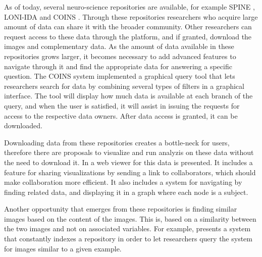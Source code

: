 
As of today, several neuro-science repositories are available, for example SPINE \autocite{guttmann_spine_2012}, LONI-IDA \autocite{van_horn_is_2009} and COINS \autocite{wood_harnessing_2014}. Through these repositories researchers who acquire large amount of data can share it with the broader community. Other researchers can request access to these data through the platform, and if granted, download the images and complementary data. As the amount of data available in these repositories grows larger, it becomes necessary to add advanced features to navigate through it and find the appropriate data for answering a specific question. The COINS system implemented a graphical query tool\autocite{wood_harnessing_2014} that lets researchers search for data by combining several types of filters in a graphical interface. The tool will display how much data is available at each branch of the query, and when the user is satisfied, it will assist in issuing the requests for access to the respective data owners.  After data access is granted, it can be downloaded.

Downloading data from these repositories creates a bottle-neck for users, therefore there are proposals to visualize and run analyzis on these data without the need to download it. In \autocite{gutman_web_2014} a web viewer for this data is presented. It includes a feature for sharing visualizations by sending a link to collaborators, which should make collaboration more efficient. It also includes a system for navigating by finding related data, and displaying it in a graph where each node is a subject. 

Another opportunity that emerges from these repositories is finding similar images based on the content of the images. This is, based on a similarity between the two images and not on associated variables. For example, \autocite{joshi_interactive_2009} presents a system that constantly indexes a repository in order to let researchers query the system for images similar to a given example. 

